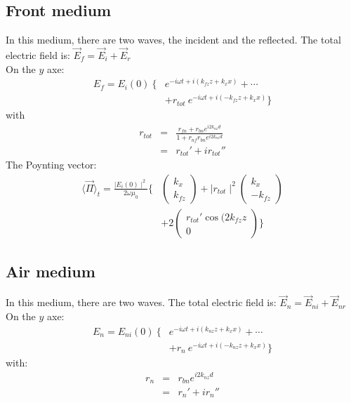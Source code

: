 \subsection{Front medium}
In this medium, there are two waves, the incident and the reflected. The total electric field is:
$\vec{E}_f = \vec{E}_i+\vec{E}_r$\\
On the $y$ axe:
\begin{eqnarray*}
E_f = E_i(0)\ 
\big\{&  e^{-i\omega t+i(k_{fz}z+k_xx)} + \cdots  \\
 &+ r_{tot} \ e^{-i\omega t+i(-k_{fz}z+k_xx)} \big\}
\end{eqnarray*}
with 
\begin{eqnarray*}
r_{tot} & = & \frac{r_{fn}+r_{bn}e^{i2k_{nz}d}}{1+r_{nf}r_{bn}e^{i2k_{nz}d}}\\
& = & r_{tot}'+ir_{tot}''
\end{eqnarray*}
The Poynting vector:\\
\begin{align*}
\langle \vec{\Pi} \rangle _t =\displaystyle\frac{\displaystyle\mid E_i(0)\mid ^2}{\displaystyle2\omega \mu_0}\Big\{&
\begin{pmatrix}
k_x\\
k_{fz}
\end{pmatrix}
+\mid r_{tot}\mid^2
\begin{pmatrix}
k_x\\
-k_{fz}
\end{pmatrix}\\
&+2
\begin{pmatrix}
r_{tot}'\cos(2k_{fz}z\\
0
\end{pmatrix} 
\Big\}
\end{align*}

\subsection{Air medium}
In this medium, there are two waves. The total electric field is:
$\vec{E}_n=\vec{E}_{ni}+\vec{E}_{nr}$\\
On the $y$ axe:\\
\begin{eqnarray*}
E_n = E_{ni}(0)\ 
\big\{&  e^{-i\omega t+i(k_{nz}z+k_xx)} + \cdots  \\
 &+ r_n \ e^{-i\omega t+i(-k_{nz}z+k_xx)} \big\}
\end{eqnarray*}
with:
\begin{eqnarray*}
r_n & = & r_{bn}e^{i2k_{nz}d}\\
& = & r_n'+ir_n''
\end{eqnarray*}

